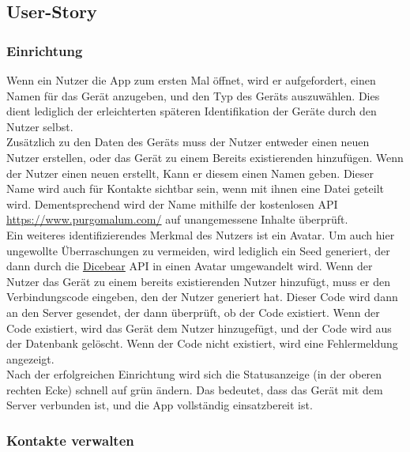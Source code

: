 \documentclass[a4paper]{article}
\begin{document}
\subsection{User-Story}

\subsubsection{Einrichtung}
Wenn ein Nutzer die App zum ersten Mal öffnet, wird er aufgefordert, einen Namen
für das Gerät anzugeben, und den Typ des Geräts auszuwählen. Dies dient
lediglich der erleichterten späteren Identifikation der Geräte durch den Nutzer
selbst.\\
Zusätzlich zu den Daten des Geräts muss der Nutzer entweder einen neuen Nutzer
erstellen, oder das Gerät zu einem Bereits existierenden hinzufügen. Wenn der
Nutzer einen neuen erstellt, Kann er diesem einen Namen geben. Dieser Name wird
auch für Kontakte sichtbar sein, wenn mit ihnen eine Datei geteilt wird.
Dementsprechend wird der Name mithilfe der kostenlosen API \url{
https://www.purgomalum.com/} auf unangemessene Inhalte überprüft.\\
Ein weiteres identifizierendes Merkmal des Nutzers ist ein Avatar. Um auch hier
ungewollte Überraschungen zu vermeiden, wird lediglich ein Seed generiert, der
dann durch die \href{ https://www.dicebear.com/}{Dicebear} API in einen Avatar
umgewandelt wird. Wenn der Nutzer das Gerät zu einem bereits existierenden
Nutzer hinzufügt, muss er den Verbindungscode eingeben, den der Nutzer generiert
hat. Dieser Code wird dann an den Server gesendet, der dann überprüft, ob der
Code existiert. Wenn der Code existiert, wird das Gerät dem Nutzer hinzugefügt,
und der Code wird aus der Datenbank gelöscht. Wenn der Code nicht existiert,
wird eine Fehlermeldung angezeigt.\\
Nach der erfolgreichen Einrichtung wird sich die Statusanzeige (in der oberen
rechten Ecke) schnell auf grün ändern. Das bedeutet, dass das Gerät mit dem
Server verbunden ist, und die App vollständig einsatzbereit ist.

\subsubsection{Kontakte verwalten}
\end{document}
